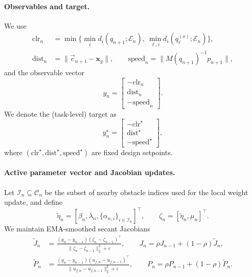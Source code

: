 \paragraph{Observables and target.}
We use
\begin{align}
\label{eq:impl:observables}
\mathrm{clr}_n &= \min\Big\{\min_i d_i(q_{n+1};\mathcal{E}_n),\ \min_{\ell,i} d_i(q_\ell^{(o)};\mathcal{E}_n)\Big\},\\
\mathrm{dist}_n &= \|\vec c_{n+1}-\mathbf{x}_g\|,\qquad
\mathrm{speed}_n = \|M(q_{n+1})^{-1}p_{n+1}\|,
\end{align}
and the observable vector
\begin{equation}
\label{eq:impl:observable_vector}
y_n=\begin{bmatrix}-\mathrm{clr}_n\\ \mathrm{dist}_n\\ -\mathrm{speed}_n\end{bmatrix}.
\end{equation}
We denote the (task-level) target as
\begin{equation}
\label{eq:impl:observable_target}
y_n^\star=\begin{bmatrix}-\mathrm{clr}^\star\\ \mathrm{dist}^\star\\ -\mathrm{speed}^\star\end{bmatrix},
\end{equation}
where $(\mathrm{clr}^\star,\mathrm{dist}^\star,\mathrm{speed}^\star)$ are fixed design setpoints.

\paragraph{Active parameter vector and Jacobian updates.}
Let $\mathcal{I}_n\subseteq \mathcal{C}_n$ be the subset of nearby obstacle indices used for the local
weight update, and define
\begin{equation}
\label{eq:impl:active_param_vector}
\tilde\eta_n=[\beta_n,\lambda_n,\{\alpha_{n,i}\}_{i\in\mathcal{I}_n}]^\top,\qquad
\zeta_n=[\tilde\eta_n,\mu_n]^\top.
\end{equation}
We maintain EMA-smoothed secant Jacobians
\begin{align}
\label{eq:impl:secant_J}
\widetilde{J}_n&=\frac{(y_n-y_{n-1})(\zeta_n-\zeta_{n-1})^\top}{\|\zeta_n-\zeta_{n-1}\|_2^2+\varepsilon},\qquad
J_n=\rho J_{n-1}+(1-\rho)\widetilde{J}_n,\\
\label{eq:impl:secant_P}
\widetilde{P}_n&=\frac{(y_n-y_{n-1})(u_{f,n}-u_{f,n-1})^\top}{\|u_{f,n}-u_{f,n-1}\|_2^2+\varepsilon},\qquad
P_n=\rho P_{n-1}+(1-\rho)\widetilde{P}_n.
\end{align}

